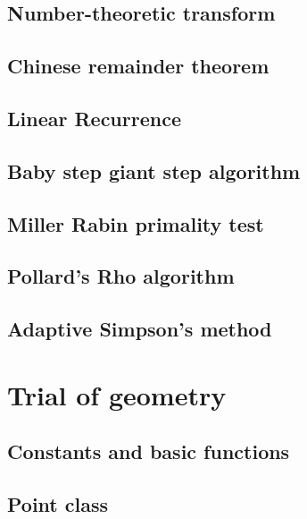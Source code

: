 \documentclass[UTF8,a4paper]{report}
\begin{document}
		\section{Number-theoretic transform}
			
		\section{Chinese remainder theorem}
			
		\section{Linear Recurrence}
			
		\section{Baby step giant step algorithm}
			
		\section{Miller Rabin primality test}
			
		\section{Pollard's Rho algorithm}
			
		\section{Adaptive Simpson's method}
			
	\chapter{Trial of geometry}
		\section{Constants and basic functions}
			
		\section{Point class}
			
\end{document}

